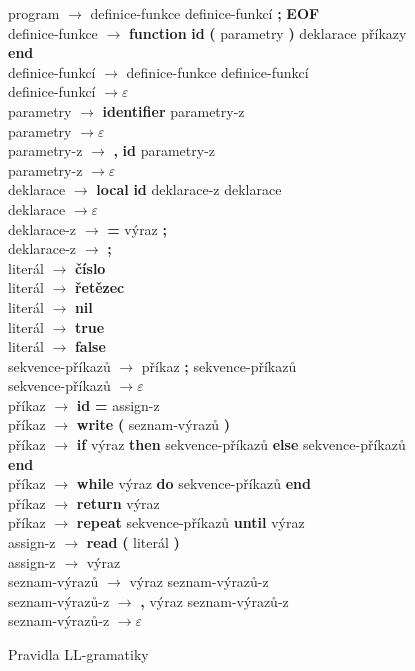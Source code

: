 \begin{figure}
program $ \rightarrow $ definice-funkce   definice-funkcí   \textbf{;}   \textbf{EOF} \\
definice-funkce $ \rightarrow $	\textbf{function} \textbf{id} \textbf{(} parametry \textbf{)} deklarace příkazy \textbf{end} \\
definice-funkcí $ \rightarrow $ definice-funkce   definice-funkcí \\
definice-funkcí $ \rightarrow \varepsilon $ \\
parametry $ \rightarrow $	\textbf{identifier}   parametry-z \\
parametry $ \rightarrow \varepsilon $ \\
parametry-z $ \rightarrow $ \textbf{,}   \textbf{id} parametry-z \\
parametry-z $ \rightarrow 	\varepsilon $ \\
deklarace $ \rightarrow $	\textbf{local} \textbf{id} deklarace-z   deklarace \\
deklarace $ \rightarrow \varepsilon $ \\
deklarace-z $ \rightarrow $ \textbf{=} výraz \textbf{;} \\
deklarace-z $ \rightarrow $ \textbf{;} \\
literál $ \rightarrow $	\textbf{číslo} \\
literál $ \rightarrow $ \textbf{řetězec} \\
literál $ \rightarrow $ \textbf{nil} \\
literál $ \rightarrow $ \textbf{true} \\
literál $ \rightarrow $ \textbf{false} \\ 
sekvence-příkazů $ \rightarrow $	příkaz   \textbf{;}   sekvence-příkazů \\
sekvence-příkazů $ \rightarrow \varepsilon $ \\
příkaz $ \rightarrow $	\textbf{id} \textbf{=} assign-z \\
příkaz $ \rightarrow $	\textbf{write} \textbf{(} seznam-výrazů \textbf{)} \\
příkaz $ \rightarrow $	\textbf{if} výraz \textbf{then} sekvence-příkazů \textbf{else} sekvence-příkazů \textbf{end} \\
příkaz $ \rightarrow $	\textbf{while} výraz \textbf{do} sekvence-příkazů \textbf{end} \\
příkaz $ \rightarrow $	\textbf{return} výraz \\
příkaz $ \rightarrow $	\textbf{repeat} sekvence-příkazů \textbf{until} výraz \\
assign-z $ \rightarrow $ \textbf{read}   \textbf{(}  literál \textbf{)} \\
assign-z $ \rightarrow $ výraz \\
seznam-výrazů $ \rightarrow $ výraz seznam-výrazů-z \\
seznam-výrazů-z $ \rightarrow $ \textbf{,} výraz seznam-výrazů-z \\
seznam-výrazů-z $ \rightarrow \varepsilon $ \\
\caption{Pravidla LL-gramatiky}
\label{syn.prog}
\end{figure}
